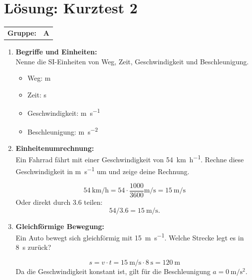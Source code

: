\documentclass[11pt, a4paper]{article}
\begin{document}
\section*{\LARGE Lösung: Kurztest 2}
\noindent
\begin{tabular}{ll}
    \textbf{Gruppe: } & \LARGE\textbf{A}  \\[0.3cm]
\end{tabular}

\begin{enumerate}[label=\textbf{\arabic*.},itemsep=0.50cm]

    \item \textbf{Begriffe und Einheiten:} \\
    Nenne die SI-Einheiten von Weg, Zeit, Geschwindigkeit und Beschleunigung.
    \begin{solutionbox}
        \begin{itemize}[itemsep=0pt, topsep=0pt]
            \item Weg: \si{\meter}
            \item Zeit: \si{\second}
            \item Geschwindigkeit: \si{\meter\per\second}
            \item Beschleunigung: \si{\meter\per\second\squared}
        \end{itemize}
    \end{solutionbox}

    \item \textbf{Einheitenumrechnung:} \\
    Ein Fahrrad fährt mit einer Geschwindigkeit von \SI{54}{\kilo\meter\per\hour}. Rechne diese Geschwindigkeit in \unit{\meter\per\second} um und zeige deine Rechnung.
    \begin{solutionbox}
        \[
        \SI{54}{\kilo\meter\per\hour}
        = 54 \cdot \frac{1000}{3600} \si{\meter\per\second}
        = \SI{15}{\meter\per\second}
        \]
        Oder direkt durch $3.6$ teilen: \[54 / 3.6 = \SI{15}{\meter\per\second}.\]
    \end{solutionbox}

    \item \textbf{Gleichförmige Bewegung:} \\
    Ein Auto bewegt sich gleichförmig mit \SI{15}{\meter\per\second}. Welche Strecke legt es in \SI{8}{\second} zurück?
    \begin{solutionbox}
        \[
        s = v \cdot t = \SI{15}{\meter\per\second} \cdot \SI{8}{\second} = \SI{120}{\meter}
        \]
        Da die Geschwindigkeit konstant ist, gilt für die Beschleunigung \(a = \SI{0}{\meter\per\second\squared}\).
    \end{solutionbox}


\end{enumerate}
\end{document}
